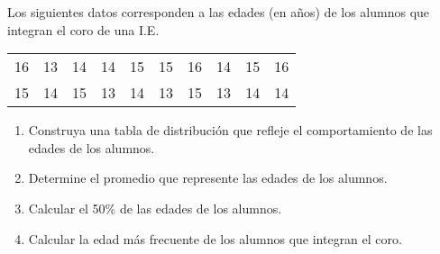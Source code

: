 \begin{exercise}
    Los siguientes datos corresponden a las edades (en años) de los alumnos que integran el coro de una I.E.
    \begin{table}[H]
        \centering
        \begin{tabular}{c c c c c c c c c c}
            16 & 13 & 14 & 14 & 15 & 15 & 16 & 14 & 15 & 16 \\
            15 & 14 & 15 & 13 & 14 & 13 & 15 & 13 & 14 & 14 \\
        \end{tabular}
    \end{table}
    \begin{enumerate}
        \item Construya una tabla de distribución que refleje el comportamiento de las edades de los alumnos.
        \item Determine el promedio que represente las edades de los alumnos.
        \item Calcular el 50\% de las edades de los alumnos.
        \item Calcular la edad más frecuente de los alumnos que integran el coro.
    \end{enumerate}
\end{exercise}
